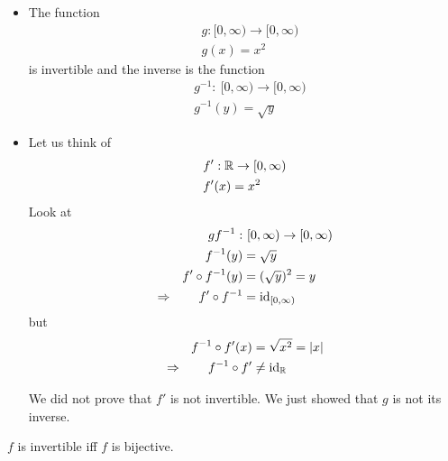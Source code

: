 \begin{ex}
	\begin{itemize}
		\item The function
	\begin{align*}
	& g:  [0, \infty) \to [0, \infty) \\
	& g(x) = x^2
	\end{align*}
	is invertible and the inverse is the function
	\begin{align*}
	& g^{-1}: ~ [0,\infty) \to [0, \infty) \\
	& g^{-1}(y)  = \sqrt y
	\end{align*}
	\item
	Let us think of 
	\begin{align*}
	& f': \mathbb R \to [0, \infty) \\
	& f'(x) = x^2
	\end{align*}
	Look at 
	\begin{align*}
	g
	f^{-1}: & ~ [0,\infty) \to [0, \infty) \\
	f^{-1}(y) & = \sqrt y \\
	f' \circ f^{-1}(y) & = (\sqrt y ) ^2 = y \\
	\Rightarrow \qquad f' \circ f^{-1} & = \operatorname{id}_{[0,\infty)}
	\end{align*}
	but
	\begin{align*}
	f^{-1} \circ f'(x) & = \sqrt{x^2} = |x| \\
	\Rightarrow \qquad f^{-1} \circ f' & \neq \operatorname{id}_\mathbb R
	\end{align*}
	
	\begin{rk}
		We did not prove that $f'$ is not invertible. We just showed that $g$ is not its inverse.
	\end{rk}	
\end{itemize}
\end{ex}

\begin{pp}
	$f$ is invertible iff $f$ is bijective.
\end{pp}

